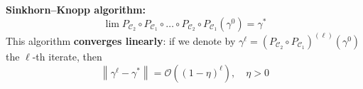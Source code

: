 \documentclass[landscape,a0paper,fontscale=0.35]{baposter} %
\theoremstyle{plain}
\theoremstyle{plain}
\theoremstyle{plain}
\theoremstyle{plain}
\DeclareMathOperator{\Ccal}{\mathcal{C}}
\newcommand{\norm}[1]{\left\lVert #1 \right\rVert}
\begin{document}
\begin{poster}
{	\vspace{0.6em}
	\textbf{Sinkhorn--Knopp algorithm:}
	\begin{equation*}
	\lim P_{\Ccal_2}\circ P_{\Ccal_1} \circ \ldots \circ P_{\Ccal_2} \circ P_{\Ccal_1} (\gamma^0) = \gamma^*
	\end{equation*}
	This algorithm \textbf{converges linearly}: if we denote by $\gamma^\ell = (P_{\Ccal_2} \circ P_{\Ccal_1})^{(\ell)}(\gamma^0)$ the $\ell$-th iterate, then
	\[ \norm{\gamma^\ell - \gamma^*} = \mathcal{O}\left((1-\eta)^\ell \right) , \quad \eta > 0 \]
}



\end{poster}
\end{document}
